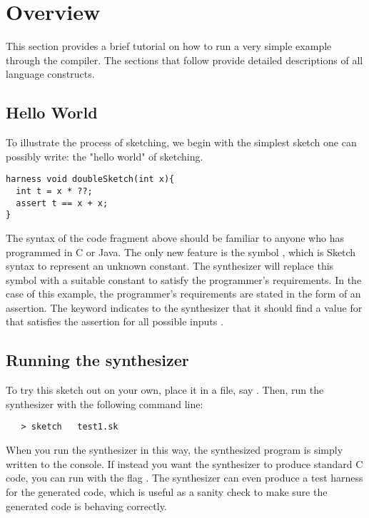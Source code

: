 \section{Overview}

This section provides a brief tutorial on how to run a very simple example through the compiler. The sections that follow provide detailed descriptions of all language constructs. 

\subsection{Hello World}
To illustrate the process of sketching, we begin with the simplest sketch one can possibly write: the "hello world" of sketching.

\begin{lstlisting}
harness void doubleSketch(int x){
  int t = x * ??;
  assert t == x + x;
}
\end{lstlisting}

The syntax of the code fragment above should be familiar to anyone who has programmed in C or Java. The only new feature is the symbol , which is Sketch syntax to represent an unknown constant. The synthesizer will replace this symbol with a suitable constant to satisfy the programmer's requirements. In the case of this example, the programmer's requirements are stated in the form of an assertion. The keyword  indicates to the synthesizer that it should find a value for  that satisfies the assertion for all possible inputs .



\subsection{Running the synthesizer}

To try this sketch out on your own, place it in a file, say . Then, run the synthesizer with the following command line:

\begin{lstlisting}
   > sketch   test1.sk
\end{lstlisting}

When you run the synthesizer in this way, the synthesized program is simply written to the console. If instead you want the synthesizer to produce standard C code, you can run with the flag . The synthesizer can even produce a test harness for the generated code, which is useful as a sanity check to make sure the generated code is behaving correctly.

